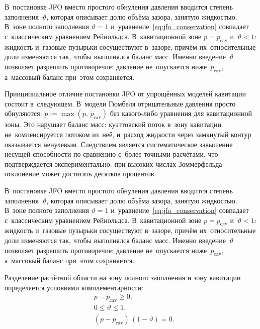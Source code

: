 В~постановке JFO вместо простого обнуления давления вводится степень заполнения~$\vartheta$, которая описывает долю объёма зазора, занятую жидкостью. В~зоне полного заполнения $\vartheta = 1$ и~уравнение~\eqref{eq:jfo_conservation} совпадает с~классическим уравнением Рейнольдса. В~кавитационной зоне $p = p_{\mathrm{cav}}$ и~$\vartheta < 1$: жидкость и~газовые пузырьки сосуществуют в~зазоре, причём их~относительные доли изменяются так, чтобы выполнялся баланс масс. Именно введение~$\vartheta$ позволяет разрешить противоречие: давление не~опускается ниже~$p_{\mathrm{cav}}$, а~массовый баланс при~этом сохраняется.

Принципиальное отличие постановки JFO от упрощённых моделей кавитации состоит в~следующем. В~модели Гюмбеля отрицательные давления просто обнуляются: $p := \max(p,\, p_{\mathrm{cav}})$ без какого-либо уравнения для кавитационной зоны. Это нарушает баланс масс: куэттовский поток в~зону кавитации не~компенсируется потоком из~неё, и~расход жидкости через замкнутый контур оказывается ненулевым. Следствием является систематическое завышение несущей способности по сравнению с~более точными расчётами, что подтверждается экспериментально: при высоких числах Зоммерфельда отклонение может достигать десятков процентов.

В~постановке JFO вместо простого обнуления давления вводится степень заполнения~$\vartheta$, которая описывает долю объёма зазора, занятую жидкостью. В~зоне полного заполнения $\vartheta = 1$ и~уравнение~\eqref{eq:jfo_conservation} совпадает с~классическим уравнением Рейнольдса. В~кавитационной зоне $p = p_{\mathrm{cav}}$ и~$\vartheta < 1$: жидкость и~газовые пузырьки сосуществуют в~зазоре, причём их~относительные доли изменяются так, чтобы выполнялся баланс масс. Именно введение~$\vartheta$ позволяет разрешить противоречие: давление не~опускается ниже~$p_{\mathrm{cav}}$, а~массовый баланс при~этом сохраняется.

Разделение расчётной области на зону полного заполнения и зону
кавитации определяется условиями комплементарности:
\begin{equation}\label{eq:jfo_complementarity}
  \begin{aligned}
    &p - p_{\mathrm{cav}} \geq 0, \\
    &0 \leq \vartheta \leq 1, \\
    &(p - p_{\mathrm{cav}})\,(1 - \vartheta) = 0.
  \end{aligned}
\end{equation}

